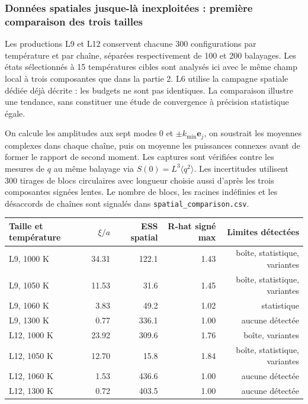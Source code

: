 \subsubsection{Données spatiales jusque-là inexploitées : première comparaison des trois tailles}

Les productions L9 et L12 conservent chacune 300 configurations par température et par chaîne, séparées respectivement de 100 et 200 balayages. Les états sélectionnés à 15 températures cibles sont analysés ici avec le même champ local à trois composantes que dans la partie 2. L6 utilise la campagne spatiale dédiée déjà décrite : les budgets ne sont pas identiques. La comparaison illustre une tendance, sans constituer une étude de convergence à précision statistique égale.

On calcule les amplitudes aux sept modes $0$ et $\pm k_{\min}\mathbf e_j$, on soustrait les moyennes complexes dans chaque chaîne, puis on moyenne les puissances connexes avant de former le rapport de second moment. Les captures sont vérifiées contre les mesures de $q$ au même balayage via $S(0)=L^3\langle q^2\rangle$. Les incertitudes utilisent 300 tirages de blocs circulaires avec longueur choisie aussi d’après les trois composantes signées lentes. Le nombre de blocs, les racines indéfinies et les désaccords de chaînes sont signalés dans \texttt{spatial\_comparison.csv}.


\begin{center}\small\begin{tabular}{lrrrr}\toprule

Taille et température & $\xi/a$ & ESS spatial & R-hat signé max & Limites détectées\\\midrule

L9, 1000 K & 34.31 & 122.1 & 1.43 & boîte, statistique, variantes\\

L9, 1050 K & 11.53 & 31.6 & 1.45 & boîte, statistique, variantes\\

L9, 1060 K & 3.83 & 49.2 & 1.02 & statistique\\

L9, 1300 K & 0.77 & 336.1 & 1.00 & aucune détectée\\

L12, 1000 K & 23.92 & 309.6 & 1.76 & boîte, variantes\\

L12, 1050 K & 12.70 & 15.8 & 1.84 & boîte, statistique, variantes\\

L12, 1060 K & 1.53 & 436.6 & 1.00 & aucune détectée\\

L12, 1300 K & 0.72 & 403.5 & 1.00 & aucune détectée\\

\bottomrule\end{tabular}\end{center}

